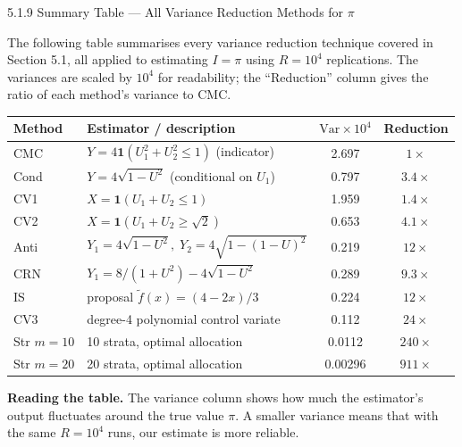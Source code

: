 \documentclass[aspectratio=169,10pt]{beamer}
\begin{document}
\begin{frame}[allowframebreaks]{5.1.9 Summary Table --- All Variance Reduction Methods for $\pi$}

The following table summarises every variance reduction technique covered in
Section 5.1, all applied to estimating $I = \pi$ using $R = 10^4$ replications.
The variances are scaled by $10^4$ for readability; the ``Reduction'' column
gives the ratio of each method's variance to CMC.

\begin{center}
\small
\begin{tabular}{llcc}
  \toprule
  Method & Estimator / description & $\mathrm{Var}\times 10^4$ & Reduction \\
  \midrule
  CMC     & $Y = 4\mathbf{1}(U_1^2{+}U_2^2\le 1)$ (indicator) & 2.697 & $1\times$ \\
  Cond    & $Y = 4\sqrt{1-U^2}$ (conditional on $U_1$)         & 0.797 & $3.4\times$ \\
  CV1     & $X = \mathbf{1}(U_1{+}U_2\le 1)$                   & 1.959 & $1.4\times$ \\
  CV2     & $X = \mathbf{1}(U_1{+}U_2\ge\sqrt{2})$             & 0.653 & $4.1\times$ \\
  Anti    & $Y_1 = 4\sqrt{1-U^2},\; Y_2 = 4\sqrt{1{-}(1{-}U)^2}$ & 0.219 & $12\times$ \\
  CRN     & $Y_1 = 8/(1{+}U^2) - 4\sqrt{1-U^2}$                & 0.289 & $9.3\times$ \\
  IS      & proposal $\tilde{f}(x) = (4-2x)/3$                  & 0.224 & $12\times$ \\
  CV3     & degree-4 polynomial control variate                  & 0.112 & $24\times$ \\
  Str $m=10$ & 10 strata, optimal allocation                    & 0.0112 & $240\times$ \\
  Str $m=20$ & 20 strata, optimal allocation                    & 0.00296 & $911\times$ \\
  \bottomrule
\end{tabular}
\end{center}

\framebreak

\textbf{Reading the table.}
The variance column shows how much the estimator's output fluctuates around
the true value $\pi$.  A smaller variance means that with the same $R = 10^4$
runs, our estimate is more reliable.


\end{frame}
\end{document}
